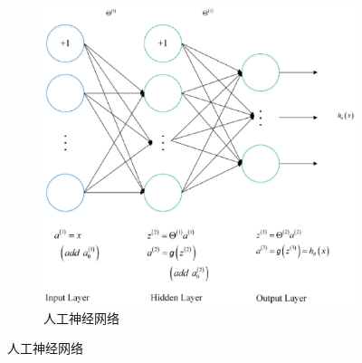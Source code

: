 \begin{figure}[htp]
\begin{subfigure}{.33\textwidth}
	   \includegraphics[width=\linewidth]{eps/2.2.09.eps}
	   \caption{人工神经网络}
	   \label{fig:2.sub.9}
	 \end{subfigure}


\end{figure}
